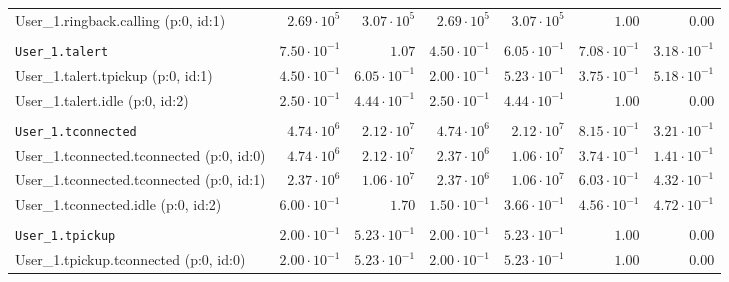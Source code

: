 \begin{table}[htbp]
{\begin{tabular}{lrrrrrr}
\hspace{3mm}User\_1.ringback.calling (p:0, id:1)      &  $2.69 \cdot 10^{5}$ &  $3.07 \cdot 10^{5}$ &  $2.69 \cdot 10^{5}$ &  $3.07 \cdot 10^{5}$ &               $1.00$ &               $0.00$ \\
\\[-8pt]\texttt{User\_1.talert}                       & $7.50 \cdot 10^{-1}$ &               $1.07$ & $4.50 \cdot 10^{-1}$ & $6.05 \cdot 10^{-1}$ & $7.08 \cdot 10^{-1}$ & $3.18 \cdot 10^{-1}$ \\
\hspace{3mm}User\_1.talert.tpickup (p:0, id:1)        & $4.50 \cdot 10^{-1}$ & $6.05 \cdot 10^{-1}$ & $2.00 \cdot 10^{-1}$ & $5.23 \cdot 10^{-1}$ & $3.75 \cdot 10^{-1}$ & $5.18 \cdot 10^{-1}$ \\
\hspace{3mm}User\_1.talert.idle (p:0, id:2)           & $2.50 \cdot 10^{-1}$ & $4.44 \cdot 10^{-1}$ & $2.50 \cdot 10^{-1}$ & $4.44 \cdot 10^{-1}$ &               $1.00$ &               $0.00$ \\
\\[-8pt]\texttt{User\_1.tconnected}                   &  $4.74 \cdot 10^{6}$ &  $2.12 \cdot 10^{7}$ &  $4.74 \cdot 10^{6}$ &  $2.12 \cdot 10^{7}$ & $8.15 \cdot 10^{-1}$ & $3.21 \cdot 10^{-1}$ \\
\hspace{3mm}User\_1.tconnected.tconnected (p:0, id:0) &  $4.74 \cdot 10^{6}$ &  $2.12 \cdot 10^{7}$ &  $2.37 \cdot 10^{6}$ &  $1.06 \cdot 10^{7}$ & $3.74 \cdot 10^{-1}$ & $1.41 \cdot 10^{-1}$ \\
\hspace{3mm}User\_1.tconnected.tconnected (p:0, id:1) &  $2.37 \cdot 10^{6}$ &  $1.06 \cdot 10^{7}$ &  $2.37 \cdot 10^{6}$ &  $1.06 \cdot 10^{7}$ & $6.03 \cdot 10^{-1}$ & $4.32 \cdot 10^{-1}$ \\
\hspace{3mm}User\_1.tconnected.idle (p:0, id:2)       & $6.00 \cdot 10^{-1}$ &               $1.70$ & $1.50 \cdot 10^{-1}$ & $3.66 \cdot 10^{-1}$ & $4.56 \cdot 10^{-1}$ & $4.72 \cdot 10^{-1}$ \\
\\[-8pt]\texttt{User\_1.tpickup}                      & $2.00 \cdot 10^{-1}$ & $5.23 \cdot 10^{-1}$ & $2.00 \cdot 10^{-1}$ & $5.23 \cdot 10^{-1}$ &               $1.00$ &               $0.00$ \\
\hspace{3mm}User\_1.tpickup.tconnected (p:0, id:0)    & $2.00 \cdot 10^{-1}$ & $5.23 \cdot 10^{-1}$ & $2.00 \cdot 10^{-1}$ & $5.23 \cdot 10^{-1}$ &               $1.00$ &               $0.00$ \\

\end{tabular}}
\end{table}
